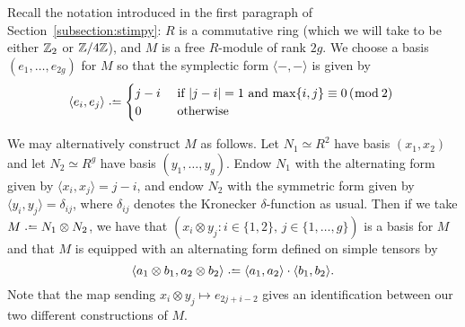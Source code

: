 Recall the notation introduced in the first paragraph of Section~\ref{subsection:stimpy}: $R$ is a commutative ring (which we will take to be either $\mathbb Z_2$ or $\mathbb Z/4\mathbb Z$), and $M$ is a free $R$-module of rank $2g$. We choose a basis $(e_1, \ldots, e_{2g})$ for $M$ so that the symplectic form $\langle -, -\rangle$ is given by
$$\langle e_i , e_j \rangle \defeq \begin{cases} j-i & \text{ if $|j-i| = 1$ and $\max\{i,j\} \equiv 0\,(\bmod\,2$) } \\ 0 & \text{ otherwise} \end{cases}$$

We may alternatively construct $M$ as follows. Let $N_1 \simeq R^{2}$ have basis $(x_1, x_2)$ and let $N_2 \simeq R^{g}$ have basis $(y_1, \ldots, y_g)$. Endow $N_1$ with the alternating form given by $\langle x_i, x_j \rangle = j - i$, and endow $N_2$ with the symmetric form given by $\langle y_i, y_j \rangle = \delta_{ij}$, where $\delta_{ij}$ denotes the Kronecker $\delta$-function as usual. Then if we take $M \defeq N_1 \otimes N_2$, we have that $(x_i \otimes y_j : i \in \{1,2\}, \, j \in \{1, \dots, g\} )$ is a basis for $M$ and that $M$ is equipped with an alternating form defined on simple tensors by
\[
\langle a_1 \otimes b_1, a_2 \otimes b_2 \rangle \defeq \langle a_1, a_2 \rangle \cdot \langle b_1, b_2 \rangle. 
\]
Note that the map sending $x_i \otimes y_j \mapsto e_{2j + i - 2}$ gives an identification between our two different constructions of $M$.

